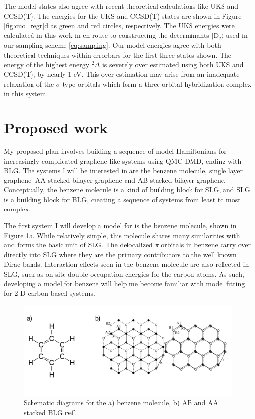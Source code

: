 \documentclass[12pt]{article}
\begin{document}
The model states also agree with recent theoretical calculations like UKS and CCSD(T).
The energies for the UKS and CCSD(T) states are shown in Figure \ref{fig:cuo_regr}d as green and red circles, respectively.
The UKS energies were calculated in this work in en route to constructing the determinants $|\text{D}_j\rangle$ used in our sampling scheme \eqref{eq:sampling}.
Our model energies agree with both theoretical techniques within errorbars for the first three states shown.
The energy of the highest energy $^2\Delta$ is severely over estimated using both UKS and CCSD(T), by nearly 1 eV.
This over estimation may arise from an inadequate relaxation of the $\sigma$ type orbitals which form a three orbital hybridization complex in this system.

\section{Proposed work}
My proposed plan involves building a sequence of model Hamiltonians for increasingly complicated graphene-like systems using QMC DMD, ending with BLG.
The systems I will be interested in are the benzene molecule, single layer graphene, AA stacked bilayer graphene and AB stacked bilayer graphene.
Conceptually, the benzene molecule is a kind of building block for SLG, and SLG is a building block for BLG, creating a sequence of systems from least to most complex.

The first system I will develop a model for is the benzene molecule, shown in Figure \ref{fig:proposed}a.
While relatively simple, this molecule shares many similarities with and forms the basic unit of SLG.
The delocalized $\pi$ orbitals in benzene carry over directly into SLG where they are the primary contributors to the well known Dirac bands.
Interaction effects seen in the benzene molecule are also reflected in SLG, such as on-site double occupation energies for the carbon atoms.
As such, developing a model for benzene will help me become familiar with model fitting for 2-D carbon based systems.

\begin{figure}
\centering
\includegraphics[width=1.0\linewidth]{./figs/proposed.pdf}
\caption{Schematic diagrams for the a) benzene molecule, b) AB and AA stacked BLG \textbf{ref}.}
\label{fig:proposed}
\end{figure}
\end{document}
